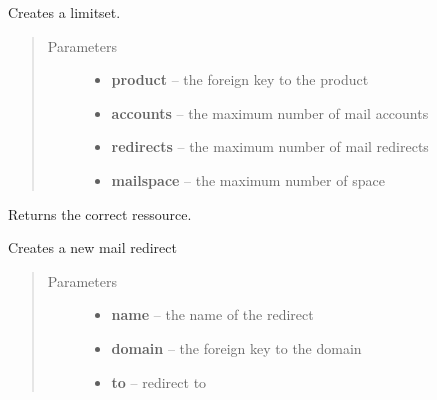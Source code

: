 \documentclass[letterpaper,10pt,english]{sphinxmanual}
\begin{document}
\begin{fulllineitems}
\label{api/mail:limeade.mail.models.Limitset}
Creates a limitset.
\begin{quote}\begin{description}
\item[{Parameters}] \leavevmode\begin{itemize}
\item {} 
\textbf{product} -- the foreign key to the product

\item {} 
\textbf{accounts} -- the maximum number of mail accounts

\item {} 
\textbf{redirects} -- the maximum number of mail redirects

\item {} 
\textbf{mailspace} -- the maximum number of space

\end{itemize}

\end{description}\end{quote}

\begin{fulllineitems}
\label{api/mail:limeade.mail.models.Limitset.utilization}
Returns the correct ressource.

\end{fulllineitems}


\end{fulllineitems}


\begin{fulllineitems}
\label{api/mail:limeade.mail.models.Redirect}
Creates a new mail redirect
\begin{quote}\begin{description}
\item[{Parameters}] \leavevmode\begin{itemize}
\item {} 
\textbf{name} -- the name of the redirect

\item {} 
\textbf{domain} -- the foreign key to the domain

\item {} 
\textbf{to} -- redirect to

\end{itemize}

\end{description}\end{quote}

\end{fulllineitems}
\end{document}
